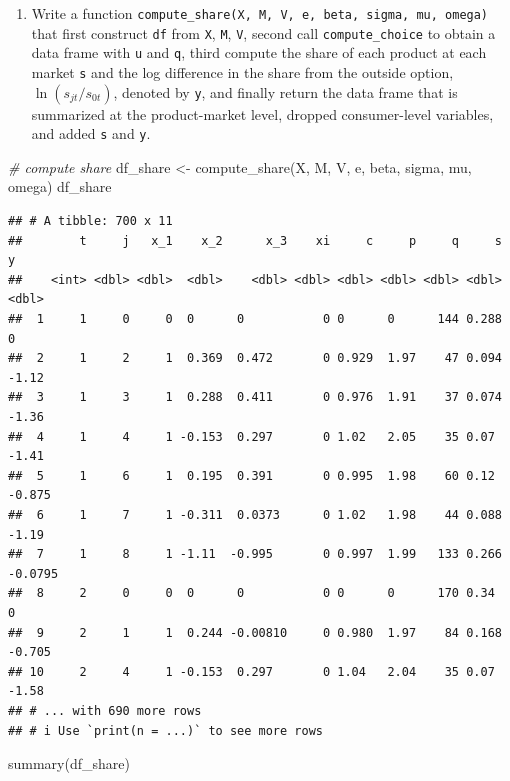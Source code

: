 \documentclass[
]{book}
\newenvironment{Shaded}{\begin{snugshade}}{\end{snugshade}}
\newcommand{\CommentTok}[1]{\textcolor[rgb]{0.56,0.35,0.01}{\textit{#1}}}
\newcommand{\FunctionTok}[1]{\textcolor[rgb]{0.00,0.00,0.00}{#1}}
\newcommand{\NormalTok}[1]{#1}
\newcommand{\OtherTok}[1]{\textcolor[rgb]{0.56,0.35,0.01}{#1}}
\providecommand{\tightlist}{%
  \setlength{\itemsep}{0pt}\setlength{\parskip}{0pt}}
\begin{document}
\begin{enumerate}
\def\labelenumi{\arabic{enumi}.}
\setcounter{enumi}{8}
\tightlist
\item
  Write a function \texttt{compute\_share(X,\ M,\ V,\ e,\ beta,\ sigma,\ mu,\ omega)} that first construct \texttt{df} from \texttt{X}, \texttt{M}, \texttt{V}, second call \texttt{compute\_choice} to obtain a data frame with \texttt{u} and \texttt{q}, third compute the share of each product at each market \texttt{s} and the log difference in the share from the outside option, \(\ln(s_{jt}/s_{0t})\), denoted by \texttt{y}, and finally return the data frame that is summarized at the product-market level, dropped consumer-level variables, and added \texttt{s} and \texttt{y}.
\end{enumerate}

\begin{Shaded}
\begin{Highlighting}[]
\CommentTok{\# compute share}
\NormalTok{df\_share }\OtherTok{\textless{}{-}}
  \FunctionTok{compute\_share}\NormalTok{(X, M, V, e, beta, sigma, }
\NormalTok{                mu, omega)}
\NormalTok{df\_share}
\end{Highlighting}
\end{Shaded}

\begin{verbatim}
## # A tibble: 700 x 11
##        t     j   x_1    x_2      x_3    xi     c     p     q     s       y
##    <int> <dbl> <dbl>  <dbl>    <dbl> <dbl> <dbl> <dbl> <dbl> <dbl>   <dbl>
##  1     1     0     0  0      0           0 0      0      144 0.288  0     
##  2     1     2     1  0.369  0.472       0 0.929  1.97    47 0.094 -1.12  
##  3     1     3     1  0.288  0.411       0 0.976  1.91    37 0.074 -1.36  
##  4     1     4     1 -0.153  0.297       0 1.02   2.05    35 0.07  -1.41  
##  5     1     6     1  0.195  0.391       0 0.995  1.98    60 0.12  -0.875 
##  6     1     7     1 -0.311  0.0373      0 1.02   1.98    44 0.088 -1.19  
##  7     1     8     1 -1.11  -0.995       0 0.997  1.99   133 0.266 -0.0795
##  8     2     0     0  0      0           0 0      0      170 0.34   0     
##  9     2     1     1  0.244 -0.00810     0 0.980  1.97    84 0.168 -0.705 
## 10     2     4     1 -0.153  0.297       0 1.04   2.04    35 0.07  -1.58  
## # ... with 690 more rows
## # i Use `print(n = ...)` to see more rows
\end{verbatim}

\begin{Shaded}
\begin{Highlighting}[]
\FunctionTok{summary}\NormalTok{(df\_share)}
\end{Highlighting}
\end{Shaded}
\end{document}
